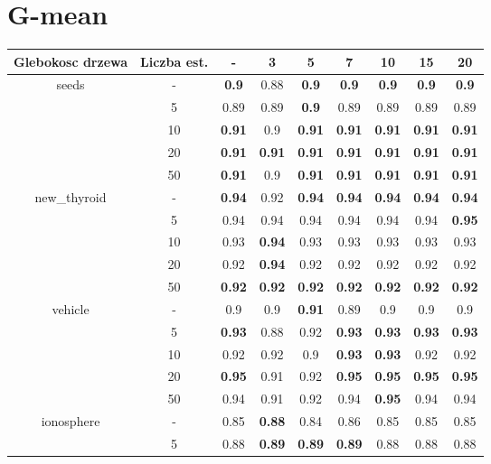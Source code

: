 \documentclass{article}%
\begin{document}
%
\section*{G{-}mean}%
\begin{longtable}{c|c|ccccccc}%
\hline%
Glebokosc drzewa&Liczba est.&{-}&3&5&7&10&15&20\\%
\hline%
\multirow{5}{*}{seeds}&{-}&\textbf{0.9}&0.88&\textbf{0.9}&\textbf{0.9}&\textbf{0.9}&\textbf{0.9}&\textbf{0.9}\\%
\cline{2%
-%
9}%
&5&0.89&0.89&\textbf{0.9}&0.89&0.89&0.89&0.89\\%
\cline{2%
-%
9}%
&10&\textbf{0.91}&0.9&\textbf{0.91}&\textbf{0.91}&\textbf{0.91}&\textbf{0.91}&\textbf{0.91}\\%
\cline{2%
-%
9}%
&20&\textbf{0.91}&\textbf{0.91}&\textbf{0.91}&\textbf{0.91}&\textbf{0.91}&\textbf{0.91}&\textbf{0.91}\\%
\cline{2%
-%
9}%
&50&\textbf{0.91}&0.9&\textbf{0.91}&\textbf{0.91}&\textbf{0.91}&\textbf{0.91}&\textbf{0.91}\\%
\hline%
\multirow{5}{*}{new\_thyroid}&{-}&\textbf{0.94}&0.92&\textbf{0.94}&\textbf{0.94}&\textbf{0.94}&\textbf{0.94}&\textbf{0.94}\\%
\cline{2%
-%
9}%
&5&0.94&0.94&0.94&0.94&0.94&0.94&\textbf{0.95}\\%
\cline{2%
-%
9}%
&10&0.93&\textbf{0.94}&0.93&0.93&0.93&0.93&0.93\\%
\cline{2%
-%
9}%
&20&0.92&\textbf{0.94}&0.92&0.92&0.92&0.92&0.92\\%
\cline{2%
-%
9}%
&50&\textbf{0.92}&\textbf{0.92}&\textbf{0.92}&\textbf{0.92}&\textbf{0.92}&\textbf{0.92}&\textbf{0.92}\\%
\hline%
\multirow{5}{*}{vehicle}&{-}&0.9&0.9&\textbf{0.91}&0.89&0.9&0.9&0.9\\%
\cline{2%
-%
9}%
&5&\textbf{0.93}&0.88&0.92&\textbf{0.93}&\textbf{0.93}&\textbf{0.93}&\textbf{0.93}\\%
\cline{2%
-%
9}%
&10&0.92&0.92&0.9&\textbf{0.93}&\textbf{0.93}&0.92&0.92\\%
\cline{2%
-%
9}%
&20&\textbf{0.95}&0.91&0.92&\textbf{0.95}&\textbf{0.95}&\textbf{0.95}&\textbf{0.95}\\%
\cline{2%
-%
9}%
&50&0.94&0.91&0.92&0.94&\textbf{0.95}&0.94&0.94\\%
\hline%
\multirow{5}{*}{ionosphere}&{-}&0.85&\textbf{0.88}&0.84&0.86&0.85&0.85&0.85\\%
\cline{2%
-%
9}%
&5&0.88&\textbf{0.89}&\textbf{0.89}&\textbf{0.89}&0.88&0.88&0.88\\%

\end{longtable}
\end{document}
